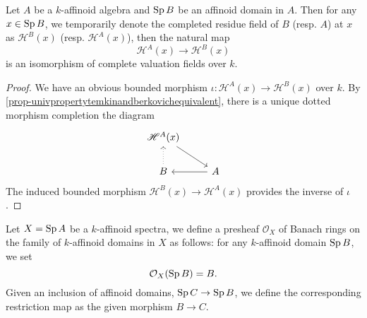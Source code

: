 \begin{corollary}\label{cor-affdomainresidueequal}
    Let $A$ be a $k$-affinoid algebra and $\operatorname{Sp} B$ be an affinoid domain in $A$. Then for any $x\in \operatorname{Sp} B$, we temporarily denote the completed residue field of $B$ (resp. $A$) at $x$ as $\mathscr{H}^B(x)$ (resp. $\mathscr{H}^A(x)$), then the natural map
    \[
        \mathscr{H}^A(x)\rightarrow \mathscr{H}^B(x)  
    \] 
    is an isomorphism of complete valuation fields over $k$.
\end{corollary}
\begin{proof}
    We have an obvious bounded morphism $\iota:\mathscr{H}^A(x)\rightarrow \mathscr{H}^B(x)$ over $k$. By \cref{prop-univpropertytemkinandberkovichequivalent}, there is a unique dotted morphism completion the diagram 
    \[
        \begin{tikzcd}
            \mathscr{H}^A(x) \arrow[rd] &             \\
            B \arrow[u, dotted]         & A \arrow[l]
        \end{tikzcd}  
    \]
    The induced bounded morphism $\mathscr{H}^B(x)\rightarrow \mathscr{H}^A(x)$ provides the inverse of $\iota$.
\end{proof}

\begin{definition}\label{def-presheafOX}
   Let $X=\operatorname{Sp} A$ be a $k$-affinoid spectra, we define a presheaf $\mathcal{O}_X$ of Banach rings on the family of $k$-affinoid domains in $X$ as follows: for any $k$-affinoid domain $\operatorname{Sp} B$, we set
   \[
        \mathcal{O}_X(\operatorname{Sp} B)=B.
   \]
   Given an inclusion of affinoid domains, $\operatorname{Sp} C\rightarrow \operatorname{Sp} B$, we define the corresponding restriction map as the given morphism $B\rightarrow C$.
\end{definition}



